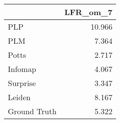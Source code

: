 \begin{tabular}{lr}
\toprule
{} & LFR_om_7 \\
\midrule
PLP          &   10.966 \\
PLM          &    7.364 \\
Potts        &    2.717 \\
Infomap      &    4.067 \\
Surprise     &    3.347 \\
Leiden       &    8.167 \\
Ground Truth &    5.322 \\
\bottomrule
\end{tabular}
